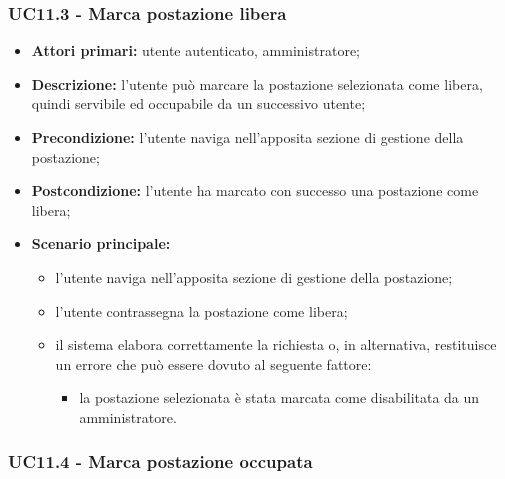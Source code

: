 \subsubsection{UC11.3 - Marca postazione libera}

\begin{itemize}
\item \textbf{Attori primari:} utente autenticato, amministratore;
\item \textbf{Descrizione:} l’utente può marcare la postazione selezionata come libera, quindi servibile ed occupabile da un successivo utente;
\item \textbf{Precondizione:} l’utente naviga nell’apposita sezione di gestione della postazione;
\item \textbf{Postcondizione:} l’utente ha marcato con successo una postazione come libera;
\item \textbf{Scenario principale:} 
	\begin{itemize}
		\item l’utente naviga nell’apposita sezione di gestione della postazione;
		\item l’utente contrassegna la postazione come libera;
		\item il sistema elabora correttamente la richiesta o, in alternativa, restituisce un errore che può essere dovuto al seguente fattore:
		\begin{itemize}
			\item la postazione selezionata è stata marcata come disabilitata da un amministratore.
		\end{itemize}
	\end{itemize}
\end{itemize}

\subsubsection{UC11.4 - Marca postazione occupata}

